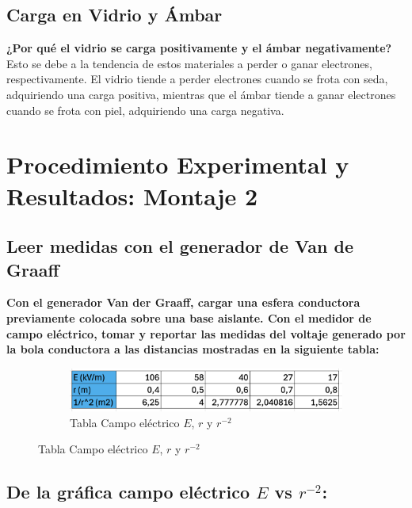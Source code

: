 \subsection{Carga en Vidrio y Ámbar}
\textbf{¿Por qué el vidrio se carga positivamente y el ámbar negativamente?} Esto se debe a la tendencia de estos materiales a perder o ganar electrones, respectivamente. El vidrio tiende a perder electrones cuando se frota con seda, adquiriendo una carga positiva, mientras que el ámbar tiende a ganar electrones cuando se frota con piel, adquiriendo una carga negativa.

\section{Procedimiento Experimental y Resultados: Montaje 2}

\subsection{Leer medidas con el generador de Van de Graaff}
\textbf{Con el generador Van der Graaff, cargar una esfera conductora previamente colocada
sobre una base aislante. Con el medidor de campo eléctrico, tomar y reportar las medidas
del voltaje generado por la bola conductora a las distancias mostradas en la siguiente
tabla:}
\begin{figure}[H]
    \centering
    \begin{subfigure}[b]{\textwidth}
        \centering
        \includegraphics[width=\textwidth]{Figures/1. Content/tablaCampoVSR2.png}
        \caption{Tabla Campo eléctrico $E$, $r$ y $r^{-2}$}
        \label{fig: tabla Campo vs r^-2}
    \end{subfigure}
    \hfill
\end{figure}

\subsection{De la gráfica campo eléctrico $E$ vs $r^{-2}$:}


